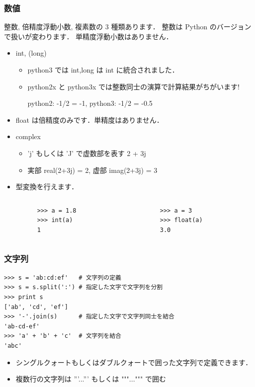 \begin{frame}[t,fragile]
\frametitle{数値}

整数, 倍精度浮動小数, 複素数の 3 種類あります．
\alert{整数は Python のバージョンで扱いが変わります．}
単精度浮動小数はありません．

\begin{itemize}
 \item int, (long)
       \begin{itemize}
	\item python3 では int,long は int に統合されました．
	\item \alert{python2x と python3x では整数同士の演算で計算結果がちがいます!}

	      python2:  -1/2 = -1, python3: -1/2 = -0.5

       \end{itemize}
 \item float は倍精度のみです．単精度はありません．
 \item complex
       \begin{itemize}
	\item 'j' もしくは 'J' で虚数部を表す 2 + 3j
	\item 実部 real(2+3j) = 2, 虚部 imag(2+3j) = 3  
       \end{itemize}
 \item 型変換を行えます．

       \begin{columns}
	\begin{column}{4cm}
	 \begin{lstlisting}
	  >>> a = 1.8
	  >>> int(a)
	  1
	 \end{lstlisting}	 
	\end{column}
	\begin{column}{4cm}
	 \begin{lstlisting}
	  >>> a = 3
	  >>> float(a)
	  3.0
	 \end{lstlisting}	 
	\end{column}
       \end{columns}
\end{itemize}

\end{frame}

\begin{frame}[t,fragile]
\frametitle{文字列}

\begin{lstlisting}
>>> s = 'ab:cd:ef'   # 文字列の定義
>>> s = s.split(':') # 指定した文字で文字列を分割
>>> print s
['ab', 'cd', 'ef']
>>> '-'.join(s)      # 指定した文字で文字列同士を結合
'ab-cd-ef'
>>> 'a' + 'b' + 'c'  # 文字列を結合
'abc'
\end{lstlisting}

\begin{itemize}
  \item シングルクォートもしくはダブルクォートで囲った文字列で定義できます．
  \item 複数行の文字列は '''...''' もしくは """...""" で囲む
\end{itemize}
\end{frame}

